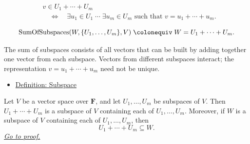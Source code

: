 \begin{remark*}
\[
\begin{aligned}
&v \in U_1+\cdots+U_m \\
&\quad\Longleftrightarrow\quad
\exists u_1 \in U_1 \;\cdots\; \exists u_m \in U_m
\text{ such that } v=u_1+\cdots+u_m.
\end{aligned}
\]
\end{remark*}

\begin{remark*}
\[
\operatorname{SumOfSubspaces}(W,\{U_1,\dots,U_m\},V)
\;\colonequiv\;
W=U_1+\cdots+U_m.
\]
\end{remark*}

\begin{remark*}[Interpretation]
The sum of subspaces consists of all vectors that can be built by adding
together one vector from each subspace. Vectors from different subspaces
interact; the representation $v = u_1 + \cdots + u_m$ need not be unique.
\end{remark*}

\begin{remark*}[Dependencies]
\begin{itemize}
  \item \hyperref[def:subspace]{Definition: Subspace}
\end{itemize}
\end{remark*}


\begin{tcolorbox}[colback=thmbox, colframe=thmborder, arc=2pt,
  left=6pt, right=6pt, top=4pt, bottom=4pt,
  title={\small\textbf{Theorem (Sum of Subspaces Is the Smallest Containing Subspace)}},
  fonttitle=\small\bfseries]
\begin{theorem}
\label{thm:sum-of-subspaces-smallest-containing}
Let $V$ be a vector space over $\mathbf{F}$, and let
$U_1,\dots,U_m$ be subspaces of $V$.
Then $U_1+\cdots+U_m$ is a subspace of $V$ containing each of
$U_1,\dots,U_m$.
Moreover, if $W$ is a subspace of $V$ containing each of
$U_1,\dots,U_m$, then
\[
U_1+\cdots+U_m \subseteq W.
\]
\hyperref[prf:sum-of-subspaces-smallest-containing]{\textit{Go to proof.}}
\end{theorem}
\end{tcolorbox}

